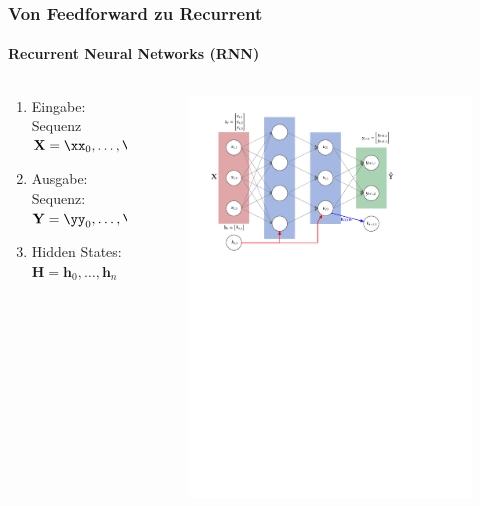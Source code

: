 \documentclass[german,aspectratio=169]{beamer}
\begin{document}
\begin{frame}
	\frametitle{Von Feedforward zu Recurrent}
	\framesubtitle{Recurrent Neural Networks (RNN)}
	\begin{columns}
		\begin{column}{0.35\textwidth}
			\begin{enumerate}[label=$\bullet$]
				\item Eingabe: Sequenz $\mathbf{X} = \xx_0, \ldots, \xx_n$
				\item Ausgabe: Sequenz: $\mathbf{Y} = \yy_0, \ldots, \yy_n$
				\item Hidden States: $\mathbf{H} = \mathbf{h}_0, \ldots, \mathbf{h}_n$
			\end{enumerate}
		\end{column}
		\begin{column}{0.65\textwidth}
			\begin{figure}
				\includegraphics[width=\textwidth]{rnn-labeled-unfold}
			\end{figure}
		\end{column}
	\end{columns}
\end{frame}
\end{document}
